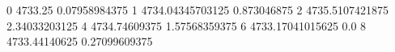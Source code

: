 0 4733.25 0.07958984375
1 4734.04345703125 0.873046875
2 4735.5107421875 2.34033203125
4 4734.74609375 1.57568359375
6 4733.17041015625 0.0
8 4733.44140625 0.27099609375
